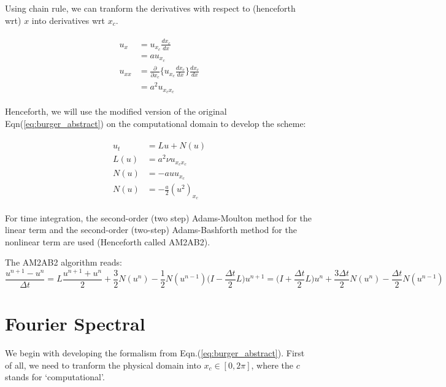 \documentclass{article}
\begin{document}
Using chain rule, we can tranform the derivatives with respect to (henceforth wrt) $x$ into derivatives wrt $x_{c}$. 

\begin{align*}
 \begin{split}
  u_{x} &= u_{x_{c}} \frac{dx_{c}}{dx}\\
        &= a u_{x_{c}}\\
  u_{xx}&= \frac{\partial}{\partial x_{c}} \bigg\{u_{x_{c}} \frac{dx_{c}}{dx} \bigg\}\frac{dx_{c}}{dx}\\
        &= a^{2} u_{x_{c} x_{c}}
 \end{split}
\end{align*}

Henceforth, we will use the modified version of the original Eqn(\ref{eq:burger_abstract}) on the computational domain to develop the scheme:

\begin{align}\label{eq:burger_computational}
\begin{split}
 u_{t}  &=  Lu + N(u)\\
 L(u)   &= a^{2}\nu u_{x_{c}x_{c}}\\
 N(u)   &= -a uu_{x_{c}}\\
 N(u)   &= -\frac{a}{2} (u^{2})_{x_{c}}
\end{split}
\end{align}

For time integration, the second-order (two step) Adams-Moulton method for the linear term and the second-order (two-step) Adams-Bashforth method for the nonlinear term are used (Henceforth called AM2AB2).

The AM2AB2 algorithm reads:
\begin{subequations}\label{eq:AM2AB2}
 \begin{equation}
  \frac{u^{n+1}-u^{n}}{\Delta t} = L \frac{u^{n+1} + u^{n}}{2} + \frac{3}{2} N(u^{n}) - \frac{1}{2} N(u^{n-1})
 \end{equation} 
 \begin{equation}
  \bigg( I - \frac{\Delta t}{2} L \bigg) u^{n+1} = \bigg( I + \frac{\Delta t}{2} L \bigg)u^{n} + \frac{3 \Delta t}{2} N(u^{n}) - \frac{\Delta t}{2} N(u^{n-1})
 \end{equation}
\end{subequations}



\section{Fourier Spectral}
We begin with developing the formalism from Eqn.(\ref{eq:burger_abstract}). First of all, we need to tranform the physical domain into $x_{c} \in [0, 2\pi]$, where the $c$ stands for `computational'.
\end{document}
